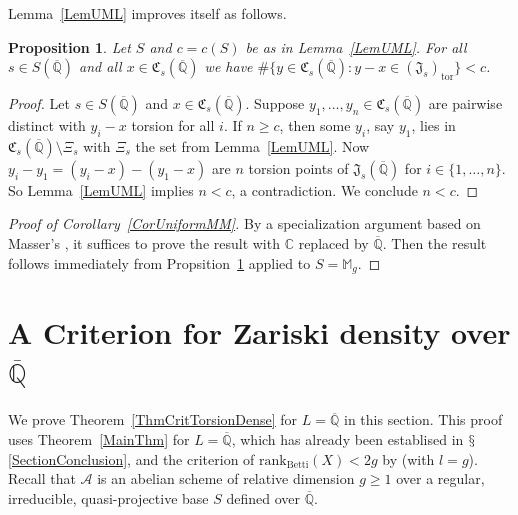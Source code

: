 \documentclass[12pt,oneside]{amsart}
\newcounter{maincounter}
\numberwithin{maincounter}{section}
\numberwithin{equation}{section}
\newtheorem{proposition}[maincounter]{Proposition}
\def\CC{\mathbb{C}}
\def\QQ{\mathbb{Q}}
\newcommand{\cal}{\mathcal}
\newcommand{\cA}{\cal{A}}
\newcommand{\IC}{{\CC}}
\newcommand{\IQbar}{{\overline{\QQ}}}
\newcommand{\ssm}{\setminus}
\begin{document}
Lemma~\ref{LemUML} improves itself as follows.

\begin{proposition}\label{PropUML}
  Let $S$ and $c=c(S)$ be as in Lemma~\ref{LemUML}. For
  all $s\in S(\IQbar)$ and all $x \in \mathfrak{C}_s(\IQbar)$ we
  have  $\#\{y \in \mathfrak{C}_s(\IQbar) : y-x \in (\mathfrak{J}_s)_{\mathrm{tor}} \} < c$.
\end{proposition}
\begin{proof}
  Let $s\in S(\IQbar)$ and $x\in \mathfrak{C}_s(\IQbar)$.
  Suppose $y_1,\ldots,y_n\in\mathfrak{C}_s(\IQbar)$ are pairwise
  distinct with $y_i-x$ torsion for all $i$.
  If $n\ge c$, then some $y_i$, say $y_1$, lies in
  $\mathfrak{C}_s(\IQbar)\ssm \Xi_s$ with $\Xi_s$ the set from
  Lemma~\ref{LemUML}.
  Now $y_i-y_1 = (y_i-x)-(y_1-x)$ are $n$  torsion points
  of $\mathfrak{J}_s(\IQbar)$ for $i\in\{1,\ldots,n\}$. So
  Lemma~\ref{LemUML} implies $n<c$, a contradiction. We conclude $n<c$. 
\end{proof}


\begin{proof}[Proof of Corollary~\ref{CorUniformMM}]
  By a specialization argument \cite[Lemma~3.1]{DGHBog} based on
  Masser's \cite{masser1989specializations}, it suffices to prove the
  result with $\IC$ replaced by $\IQbar$. Then the result follows
  immediately from Propsition~\ref{PropUML} applied to $S =
  \mathbb{M}_g$.
\end{proof}





\section{A Criterion for Zariski density over $\IQbar$}
\label{SectionCriterionTorsionDenseOverIQbar}
We prove Theorem~\ref{ThmCritTorsionDense} for $L=\IQbar$ in this
section. This proof uses Theorem~\ref{MainThm} for $L=\IQbar$, which
has already been establised in $\mathsection$\ref{SectionConclusion},
and the criterion of $\mathrm{rank}_{\mathrm{Betti}}(X) < 2g$ by
\cite[Theorem~1.1]{GaoBettiRank} (with $l = g$).
Recall that $\cA$ is an abelian scheme of relative dimension $g\ge 1$
over a regular, irreducible, quasi-projective base $S$ defined over $\IQbar$. 
\end{document}
